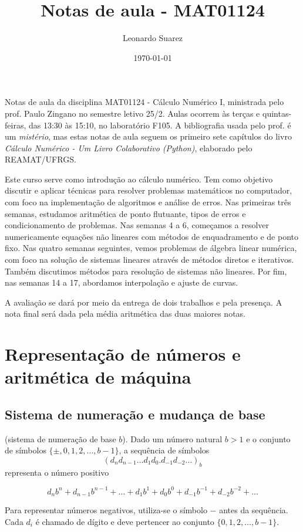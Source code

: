 \documentclass{article}
\title{Notas de aula - MAT01124}
\author{Leonardo Suarez}
\date{\today}
\begin{document}
\maketitle

Notas de aula da disciplina MAT01124 - Cálculo Numérico I, ministrada pelo prof. Paulo Zingano no semestre letivo 25/2. Aulas ocorrem às terças e quintas-feiras, das 13:30 às 15:10, no laboratório F105. A bibliografia usada pelo prof. é um \emph{mistério}, mas estas notas de aula seguem os primeiro sete capítulos do livro \emph{Cálculo Numérico - Um Livro Colaborativo (Python)}, elaborado pelo REAMAT/UFRGS.

Este curso serve como introdução ao cálculo numérico. Tem como objetivo discutir e aplicar técnicas para resolver problemas matemáticos no computador, com foco na implementação de algoritmos e análise de erros. Nas primeiras três semanas, estudamos aritmética de ponto flutuante, tipos de erros e condicionamento de problemas. Nas semanas 4 a 6, começamos a resolver numericamente equações não lineares com métodos de enquadramento e de ponto fixo. Nas quatro semanas seguintes, vemos problemas de álgebra linear numérica, com foco na solução de sistemas lineares através de métodos diretos e iterativos. Também discutimos métodos para resolução de sistemas não lineares. Por fim, nas semanas 14 a 17, abordamos interpolação e ajuste de curvas.

A avaliação se dará por meio da entrega de dois trabalhos e pela presença. A nota final será dada pela média aritmética das duas maiores notas.

\tableofcontents

\section{Representação de números e aritmética de máquina}

\subsection{Sistema de numeração e mudança de base}

\begin{defn} (sistema de numeração de base \(b\)). 
    Dado um número natural \(b > 1\) e o conjunto de símbolos \(\{\pm, 0, 1, 2, \ldots, b-1\}\), a sequência de símbolos
    \begin{equation}
        (d_n d_{n-1} \ldots d_1 d_0 . d_{-1} d_{-2} \ldots)_b
    \end{equation}
    representa o número positivo

    \begin{equation}
        d_n b^n + d_{n-1} b^{n-1} + \ldots + d_1 b^1 + d_0 b^0 + d_{-1} b^{-1} + d_{-2} b^{-2} + \ldots
    \end{equation}

    Para representar números negativos, utiliza-se o símbolo \(-\) antes da sequência. Cada \(d_i\) é chamado de dígito e deve pertencer ao conjunto \(\{0, 1, 2, \ldots, b-1\}\).
\end{defn}
\end{document}
